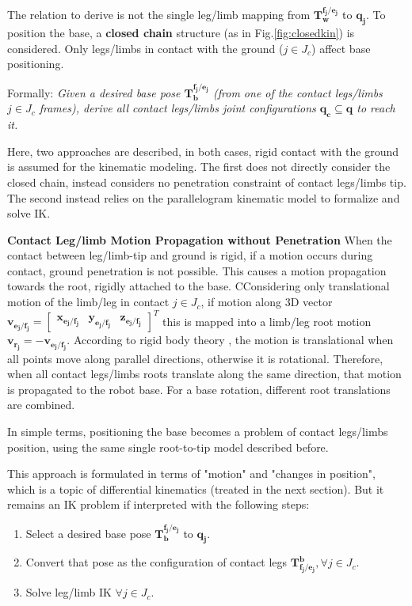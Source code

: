 The relation to derive is not the single leg/limb mapping from
$\mathbf{T^{f_j/e_j}_w}$ to $\mathbf{q_j}$. To position the base, a \textbf{closed chain} structure (as in Fig.\ref{fig:closedkin}) is considered. Only legs/limbs in contact with the ground ($j \in J_c$) affect base positioning.

Formally: 
\textit{Given a desired base pose $\mathbf{T^{f_j/e_j}_b}$ (from one of the contact legs/limbs $j\in J_c$ frames), derive all contact legs/limbs joint configurations $\mathbf{q_c} \subseteq \mathbf{q}$ to reach it.}

Here, two approaches are described, in both cases, rigid contact with the ground is assumed for the kinematic modeling.
The first does not directly consider the closed chain, instead considers no penetration constraint of contact legs/limbs tip. 
The second instead relies on the parallelogram kinematic model to formalize and solve IK. 

\textbf{Contact Leg/limb Motion Propagation without Penetration}\newline 
When the contact between leg/limb-tip and ground is rigid, if a motion occurs during contact, ground penetration is not possible. This causes a motion propagation towards the root, rigidly attached to the base. CConsidering only translational motion of the limb/leg in contact $j \in J_c$, if motion along 3D vector $\mathbf{v_{e_j/f_j}} = \begin{bmatrix}
\mathbf{x_{e_j/f_j}} & \mathbf{y_{e_j/f_j}} & \mathbf{z_{e_j/f_j}}\end{bmatrix}^T $
this is mapped into a limb/leg root motion $\mathbf{v_{r_j}} = -\mathbf{v_{e_j/f_j}}$. 
According to rigid body theory \cite{RoboticMechanics}, the motion is translational when all points move along parallel directions, otherwise it is rotational.  
Therefore, when all contact legs/limbs roots translate along the same direction, that motion is propagated to the robot base. For a base rotation, different root translations are combined.

In simple terms, positioning the base becomes a problem of contact legs/limbs position, using the same single root-to-tip model described before. 

This approach is formulated in terms of "motion" and "changes in position", which is a topic of differential kinematics (treated in the next section). But it remains an IK problem if interpreted with the following steps:
\begin{enumerate}
    \setlength\itemsep{-0.7em} 
    \item Select a desired base pose $\mathbf{T^{f_j/e_j}_b}$ to $\mathbf{q_j}$.
    \item Convert that pose as the configuration of contact legs $\mathbf{T^b_{f_j/e_j}}, \forall j \in J_c$. 
    \item Solve leg/limb IK $\forall j \in J_c$.
\end{enumerate}


